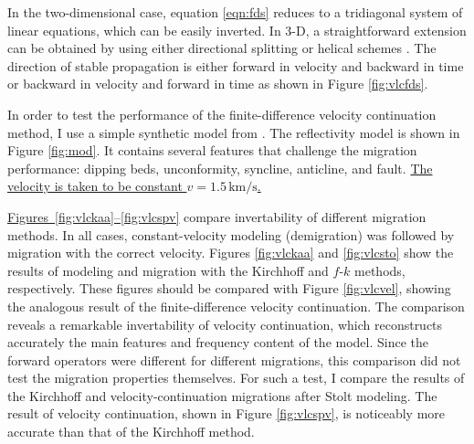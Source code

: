 
In the two-dimensional case, equation \ref{eqn:fds} reduces to a
tridiagonal system of linear equations, which can be easily inverted.
In 3-D, a straightforward extension can be obtained by using either
directional splitting or helical schemes \cite{SEG-1998-1124}. The
direction of stable propagation is either forward in velocity and
backward in time or backward in velocity and forward in time as shown
in Figure \ref{fig:vlcfds}.



In order to test the performance of the finite-difference velocity
continuation method, I use a simple synthetic model from
. The reflectivity model is shown in
Figure \ref{fig:mod}. It contains several features that challenge the
migration performance: dipping beds, unconformity, syncline,
anticline, and fault. \uline{The velocity is taken to be constant 
$v=1.5\,\mbox{km/s}$.}


\uline{Figures~\ref{fig:vlckaa}--\ref{fig:vlcspv}} compare invertability of different
migration methods. In all cases, constant-velocity modeling (demigration) 
was followed by migration
with the correct velocity.  Figures \ref{fig:vlckaa} and \ref{fig:vlcsto} show the
results of modeling and migration with the Kirchhoff \cite{GEO43.01.00490076}
and $f$-$k$ \cite{GEO43.01.00230048} methods, respectively. These figures
should be compared with Figure \ref{fig:vlcvel}, showing the analogous result of
the finite-difference velocity continuation.  The comparison reveals a
remarkable invertability of velocity continuation, which reconstructs
accurately the main features and frequency content of the model. Since the
forward operators were different for different migrations, this comparison did
not test the migration properties themselves. For such a test, I compare the
results of the Kirchhoff and velocity-continuation migrations after Stolt
modeling.  The result of velocity continuation, shown in Figure \ref{fig:vlcspv},
is noticeably more accurate than that of the Kirchhoff method.

